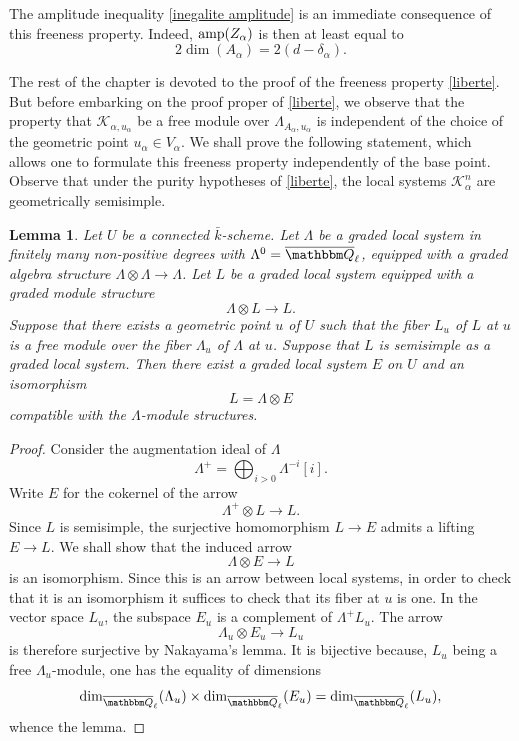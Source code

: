 \documentclass[12pt,english]{smfart}
\numberwithin{equation}{subsection}
\newtheorem{lemma}[equation]{Lemma}
\theoremstyle{remark}
\newcommand\calK{{\mathcal K}}
\newcommand\QQ{{\mathbbm Q}}
\newcommand\Ql{{\overline\QQ_\ell}}
\begin{document}
The amplitude inequality \ref{inegalite amplitude} is an immediate consequence of this freeness property. Indeed, ${\rm amp}(Z_\alpha)$ is then at least equal to
$$2\dim(A_\alpha)=2(d-\delta_\alpha).$$

The rest of the chapter is devoted to the proof of the freeness property \ref{liberte}. But before embarking on the proof proper of \ref{liberte}, we observe that the property that $\calK_{\alpha,u_\alpha}$ be a free module over $\Lambda_{A_\alpha,u_\alpha}$ is independent of the choice of the geometric point $u_\alpha\in V_\alpha$. We shall prove the following statement, which allows one to formulate this freeness property independently of the base point. Observe that under the purity hypotheses of \ref{liberte}, the local systems $\calK^n_\alpha$ are geometrically semisimple.

\begin{lemma}\label{liberte sans point base}
Let $U$ be a connected $\bar k$-scheme. Let $\Lambda$ be a graded local system in finitely many non-positive degrees with $\Lambda^0=\Ql$, equipped with a graded algebra structure $\Lambda\otimes \Lambda\rightarrow \Lambda$. Let $L$ be a graded local system equipped with a graded module structure
$$\Lambda\otimes L\rightarrow L.$$
Suppose that there exists a geometric point $u$ of $U$ such that the fiber $L_u$ of $L$ at $u$ is a free module over the fiber $\Lambda_u$ of $\Lambda$ at $u$. Suppose that $L$ is semisimple as a graded local system. Then there exist a graded local system $E$ on $U$ and an isomorphism
$$L=\Lambda\otimes E$$
compatible with the $\Lambda$-module structures.
\end{lemma}

\begin{proof}
Consider the augmentation ideal of $\Lambda$
$$\Lambda^+=\bigoplus_{i>0}\Lambda^{-i}[i].$$
Write $E$ for the cokernel of the arrow
$$\Lambda^+\otimes L\rightarrow L.$$
Since $L$ is semisimple, the surjective homomorphism $L\rightarrow E$ admits a lifting $E\rightarrow L$. We shall show that the induced arrow
$$\Lambda\otimes E\rightarrow L$$
is an isomorphism. Since this is an arrow between local systems, in order to check that it is an isomorphism it suffices to check that its fiber at $u$ is one. In the vector space $L_u$, the subspace $E_u$ is a complement of $\Lambda^+L_u$. The arrow
$$\Lambda_u\otimes E_u\rightarrow L_u$$
is therefore surjective by Nakayama's lemma. It is bijective because, $L_u$ being a free $\Lambda_u$-module, one has the equality of dimensions
$$\dim_\Ql(\Lambda_u)\times \dim_\Ql(E_u)=\dim_\Ql(L_u),$$
whence the lemma.
\end{proof}
\end{document}
